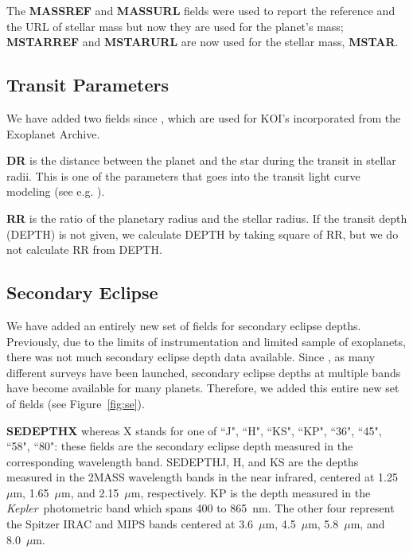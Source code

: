 \documentclass[11pt,preprint]{aastex}
\def\micron{$\mu$m}
\def\kepler{\textit{Kepler}}
\def\micron{$\mu$m}
\begin{document}
\begin{CJK*}{UTF8}{gbsn}
The {\bf MASSREF} and {\bf MASSURL} fields were used to report the
reference and the URL of stellar mass but now they are used for the planet's
mass; {\bf MSTARREF} and {\bf MSTARURL} are now used for the stellar
mass, {\bf MSTAR}.

\subsection{Transit Parameters}\label{sec:transit}

We have added two fields since \cite{Wright2011}, which are used for
KOI's incorporated from the Exoplanet Archive. 

{\bf DR} is the distance between the planet and the star during the
transit in stellar radii. This is one of the parameters that goes into
the transit light curve modeling (see e.g. \citealt{Batalha2013}).

{\bf RR} is the ratio of the planetary radius and the stellar
radius. If the transit depth (DEPTH) is not given, we calculate DEPTH
by taking square of RR, but we do not calculate RR from DEPTH.


\subsection{Secondary Eclipse}\label{sec:se}

We have added an entirely new set of fields for secondary
eclipse depths. Previously, due to the limits of instrumentation and limited
sample of exoplanets, there was not much secondary eclipse depth data
available. Since \cite{Wright2011}, as many different surveys have
been launched, secondary eclipse depths at multiple
bands have become available for many planets. Therefore, we added
this entire new set of fields (see Figure~\ref{fig:se}).

{\bf SEDEPTHX} whereas X stands for one of ``J", ``H", ``KS", ``KP", ``36", ``45", ``58", ``80":
these fields are the secondary eclipse depth measured in the
corresponding wavelength band. SEDEPTHJ, H, and KS are the depths
measured in the 2MASS wavelength bands in the near infrared, centered
at 1.25~\micron, 1.65~\micron, and 2.15~\micron, respectively. KP is
the depth measured in the \kepler\ photometric band which spans 400 to 865~nm. The other four represent the Spitzer IRAC and MIPS bands centered at
3.6~\micron, 4.5~\micron, 5.8~\micron, and 8.0~\micron.


\end{CJK*}
\end{document}
